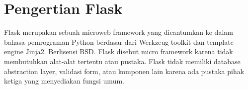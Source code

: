 
\section{Pengertian Flask}
Flask merupakan sebuah microweb framework yang dicantumkan ke dalam bahasa pemrograman Python berdasar dari Werkzeug toolkit dan template engine Jinja2. Berlisensi BSD. Flask disebut micro framework karena tidak membutuhkan alat-alat tertentu atau pustaka. Flask tidak memiliki database abstraction layer, validasi form, atau komponen lain karena ada pustaka pihak ketiga yang menyediakan fungsi umum.